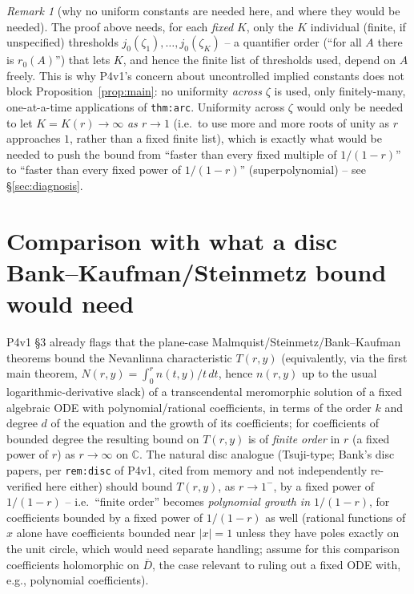 \documentclass[11pt]{article}
\theoremstyle{remark}
\newtheorem{remark}[theorem]{Remark}
\newcommand{\C}{\mathbb C}
\begin{document}
\begin{remark}[why no uniform constants are needed here, and where they would be needed]\label{rem:diagonal}
The proof above needs, for each \emph{fixed} $K$, only the $K$ individual (finite, if unspecified)
thresholds $j_0(\zeta_1),\ldots,j_0(\zeta_K)$ -- a quantifier order (``for all $A$ there is $r_0(A)$'')
that lets $K$, and hence the finite list of thresholds used, depend on $A$ freely. This is why P4v1's
concern about uncontrolled implied constants does not block Proposition~\ref{prop:main}: no
uniformity \emph{across} $\zeta$ is used, only finitely-many, one-at-a-time applications of
\texttt{thm:arc}. Uniformity across $\zeta$ would only be needed to let $K=K(r)\to\infty$ \emph{as
$r\to1$} (i.e.\ to use more and more roots of unity as $r$ approaches $1$, rather than a fixed finite
list), which is exactly what would be needed to push the bound from ``faster than every fixed multiple
of $1/(1-r)$'' to ``faster than every fixed power of $1/(1-r)$'' (superpolynomial) -- see
\S\ref{sec:diagnosis}.
\end{remark}

\section{Comparison with what a disc Bank--Kaufman/Steinmetz bound would need}\label{sec:compare}

P4v1 \S3 already flags that the plane-case Malmquist/Steinmetz/Bank--Kaufman theorems bound the
Nevanlinna characteristic $T(r,y)$ (equivalently, via the first main theorem, $N(r,y)=\int_0^r
n(t,y)/t\,dt$, hence $n(r,y)$ up to the usual logarithmic-derivative slack) of a transcendental
meromorphic solution of a fixed algebraic ODE with polynomial/rational coefficients, in terms of the
order $k$ and degree $d$ of the equation and the growth of its coefficients; for coefficients of
bounded degree the resulting bound on $T(r,y)$ is of \emph{finite order} in $r$ (a fixed power of
$r$) as $r\to\infty$ on $\C$. The natural disc analogue (Tsuji-type; Bank's disc papers, per
\texttt{rem:disc} of P4v1, cited from memory and not independently re-verified here either) should
bound $T(r,y)$, as $r\to1^-$, by a fixed power of $1/(1-r)$ -- i.e.\ ``finite order'' becomes
\emph{polynomial growth in $1/(1-r)$}, for coefficients bounded by a fixed power of $1/(1-r)$ as well
(rational functions of $x$ alone have coefficients bounded near $|x|=1$ unless they have poles
exactly on the unit circle, which would need separate handling; assume for this comparison
coefficients holomorphic on $\overline D$, the case relevant to ruling out a fixed ODE with, e.g.,
polynomial coefficients).
\end{document}
